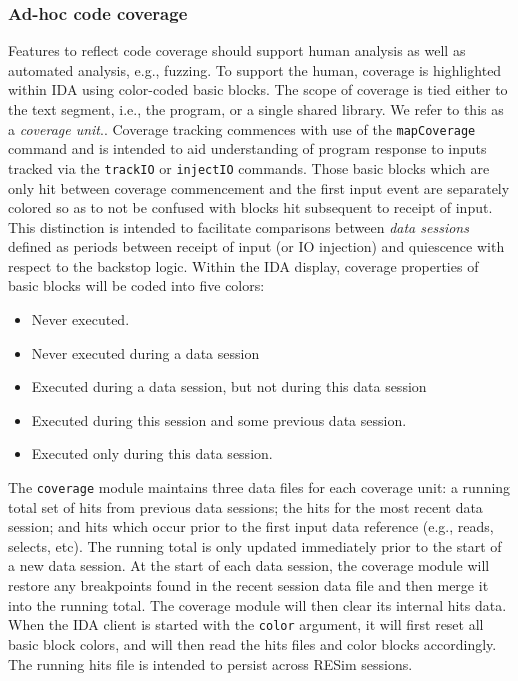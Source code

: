 \documentclass[titlepage]{article}
\begin{document}
\subsubsection{Ad-hoc code coverage}
Features to reflect code coverage should support human analysis as well as automated analysis, e.g., fuzzing.  To support the human, coverage is highlighted within IDA using color-coded
basic blocks.  The scope of coverage is tied either to the text segment, i.e., the program, or a single shared library.  We refer to this as a \textit{coverage unit}..  
Coverage tracking commences with use of the {\tt mapCoverage} command and is intended to aid understanding of program response to inputs tracked via 
the {\tt trackIO} or {\tt injectIO} commands.  Those basic blocks which are only hit between coverage commencement and the first input event are separately colored so as to not
be confused with blocks hit subsequent to receipt of input.  This distinction is intended to facilitate comparisons between \textit{data sessions} defined as periods
between receipt of input (or IO injection) and quiescence with respect to the backstop logic.
Within the IDA display, coverage properties of basic blocks will be
coded into five colors:
\begin{itemize}
\item Never executed.
\item Never executed during a data session
\item Executed during a data session, but not during this data session
\item Executed during this session and some previous data session.
\item Executed only during this data session.
\end{itemize}

The {\tt coverage} module maintains three data files for each coverage unit: a running total set of hits from previous data sessions; the hits for the most recent data session;
and hits which occur prior to the first input data reference (e.g., reads, selects, etc).  The running total is only updated immediately prior to the start 
of a new data session.  At the start of each data session, the coverage module will restore any breakpoints found
in the recent session data file and then merge it into the running total.  The coverage module will then clear its internal hits data.  
When the IDA client is started with the {\tt color} argument, it will first
reset all basic block colors,  and will then read the hits files and color blocks accordingly.  The running hits file is intended to persist across
RESim sessions.  
\end{document}
